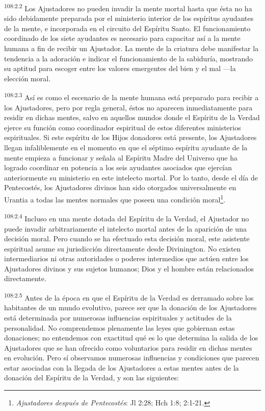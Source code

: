 \documentclass[twoside, 11pt]{book}
\begin{document}
\par
\textsuperscript{108:2.2} Los Ajustadores no pueden invadir la mente mortal hasta que ésta no ha sido debidamente preparada por el ministerio interior de los espíritus ayudantes de la mente, e incorporada en el circuito del Espíritu Santo. El funcionamiento coordinado de los siete ayudantes es necesario para capacitar así a la mente humana a fin de recibir un Ajustador. La mente de la criatura debe manifestar la tendencia a la adoración e indicar el funcionamiento de la sabiduría, mostrando su aptitud para escoger entre los valores emergentes del bien y el mal ---la elección moral.

\par
\textsuperscript{108:2.3} Así es como el escenario de la mente humana está preparado para recibir a los Ajustadores, pero por regla general, éstos no aparecen inmediatamente para residir en dichas mentes, salvo en aquellos mundos donde el Espíritu de la Verdad ejerce su función como coordinador espiritual de estos diferentes ministerios espirituales. Si este espíritu de los Hijos donadores está presente, los Ajustadores llegan infaliblemente en el momento en que el séptimo espíritu ayudante de la mente empieza a funcionar y señala al Espíritu Madre del Universo que ha logrado coordinar en potencia a los seis ayudantes asociados que ejercían anteriormente su ministerio en este intelecto mortal. Por lo tanto, desde el día de Pentecostés, los Ajustadores divinos han sido otorgados universalmente en Urantia a todas las mentes normales que poseen una condición moral\footnote{\textit{Ajustadores después de Pentecostés}: Jl 2:28; Hch 1:8; 2:1-21.}.

\par
\textsuperscript{108:2.4} Incluso en una mente dotada del Espíritu de la Verdad, el Ajustador no puede invadir arbitrariamente el intelecto mortal antes de la aparición de una decisión moral. Pero cuando se ha efectuado esta decisión moral, este asistente espiritual asume su jurisdicción directamente desde Divinington. No existen intermediarios ni otras autoridades o poderes intermedios que actúen entre los Ajustadores divinos y sus sujetos humanos; Dios y el hombre están relacionados directamente.

\par
\textsuperscript{108:2.5} Antes de la época en que el Espíritu de la Verdad es derramado sobre los habitantes de un mundo evolutivo, parece ser que la donación de los Ajustadores está determinada por numerosas influencias espirituales y actitudes de la personalidad. No comprendemos plenamente las leyes que gobiernan estas donaciones; no entendemos con exactitud qué es lo que determina la salida de los Ajustadores que se han ofrecido como voluntarios para residir en dichas mentes en evolución. Pero sí observamos numerosas influencias y condiciones que parecen estar asociadas con la llegada de los Ajustadores a estas mentes antes de la donación del Espíritu de la Verdad, y son las siguientes:
\end{document}
